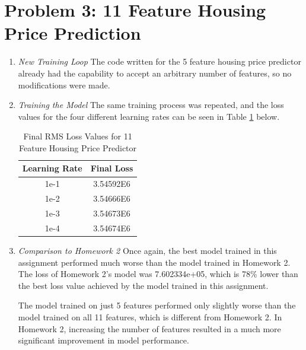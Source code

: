 \documentclass{article}
\begin{document}
    \newpage
    \section{Problem 3: 11 Feature Housing Price Prediction}

    \begin{enumerate}[label=\alph*.]
        \item \textit{New Training Loop}
        The code written for the 5 feature housing price predictor already had the capability to accept an arbitrary number of features, so no modifications were made.
        \item \textit{Training the Model}
        The same training process was repeated, and the loss values for the four different learning rates can be seen in Table \ref{tab:house_loss_2} below.

        \begin{table}[htbp]
            \centering
            \begin{tabular}{|c|c|}
                \hline
                \textbf{Learning Rate} & \textbf{Final Loss} \\
                \hline
                1e-1 & 3.54592E6\\
                \hline
                1e-2 & 3.54666E6 \\
                \hline
                1e-3 & 3.54673E6 \\
                \hline
                1e-4 & 3.54674E6 \\
                \hline
            \end{tabular}
            \caption{Final RMS Loss Values for 11 Feature Housing Price Predictor}
            \label{tab:house_loss_2}
        \end{table}

        \item \textit{Comparison to Homework 2}
        Once again, the best model trained in this assignment performed much worse than the model trained in Homework 2. The loss of Homework 2's model was 7.602334e+05, which is 78\% lower than the best loss value achieved by the model trained in this assignment.

        The model trained on just 5 features performed only slightly worse than the model trained on all 11 features, which is different from Homework 2. In Homework 2, increasing the number of features resulted in a much more significant improvement in model performance.
         
    \end{enumerate}
\end{document}
